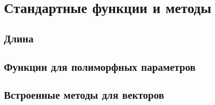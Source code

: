 \hypertarget{stdfuncs}{%
\section{Стандартные функции и методы}\label{stdfuncs:chapter}}

\hypertarget{stdlen}{%
\subsection{Длина}\label{stdfuncs:stdlen}}

\hypertarget{stdpoly}{%
\subsection{Функции для полиморфных параметров}\label{stdfuncs:stdpoly}}

\hypertarget{stdvector}{%
\subsection{Встроенные методы для векторов}\label{stdfuncs:stdvector}}

